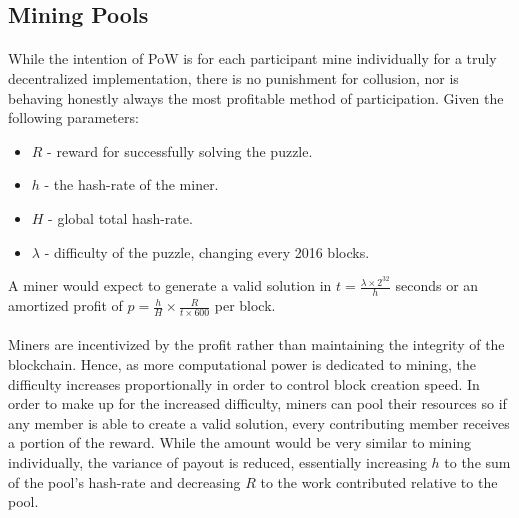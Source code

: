 
\subsection{Mining Pools}

\paragraph{} While the intention of PoW is for each participant mine individually for a truly decentralized implementation, there is no punishment for collusion, nor is behaving honestly always the most profitable method of participation. Given the following parameters:

\begin{itemize}
  \item $R$ - reward for successfully solving the puzzle.
  \item $h$ - the hash-rate of the miner.
  \item $H$ - global total hash-rate.
  \item $\lambda$ - difficulty of the puzzle, changing every 2016 blocks.
\end{itemize}

\noindent A miner would expect to generate a valid solution in $t = \frac{\lambda \times 2^{32}}{h}$ \cite{difficulty2019} seconds or an amortized profit of $p = \frac{h}{H} \times \frac{R}{t \times 600}$ per block.

\paragraph{} Miners are incentivized by the profit rather than maintaining the integrity of the blockchain. Hence, as  more computational power is dedicated to mining, the difficulty increases proportionally in order to control block creation speed. In order to make up for the increased difficulty, miners can pool their resources so if any member is able to create a valid solution, every contributing member receives a portion of the reward. While the amount would be very similar to mining individually, the variance of payout is reduced, essentially increasing $h$ to the sum of the pool's hash-rate and decreasing $R$ to the work contributed relative to the pool.

